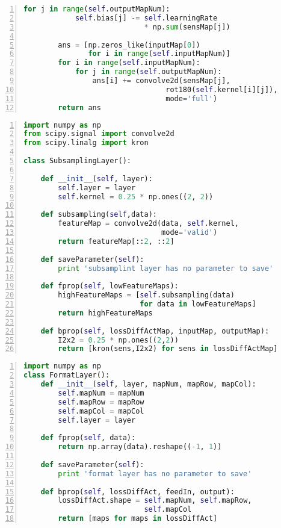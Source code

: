 \begin{lstlisting}[language=Python,numbers=left, frame=shadowbox, rulesepcolor=\color{cadegrey}, caption=\text{ConvLayer.py}]
        for j in range(self.outputMapNum):
            self.bias[j] -= self.learningRate 
                            * np.sum(sensMap[j])

        ans = [np.zeros_like(inputMap[0]) 
               for i in range(self.inputMapNum)]
        for i in range(self.inputMapNum):
            for j in range(self.outputMapNum):
                ans[i] += convolve2d(sensMap[j], 
                                 rot180(self.kernel[i][j]),
                                 mode='full')
        return ans
\end{lstlisting}

\newpage

\begin{lstlisting}[language=Python,numbers=left, frame=shadowbox, rulesepcolor=\color{cadegrey}, caption=\text{SubsamplingLayer.py}]
import numpy as np
from scipy.signal import convolve2d
from scipy.linalg import kron

class SubsamplingLayer():
    
    def __init__(self, layer):
        self.layer = layer
        self.kernel = 0.25 * np.ones((2, 2))
    
    def subsampling(self,data):
        featureMap = convolve2d(data, self.kernel, 
                                mode='valid')
        return featureMap[::2, ::2]
    
    def saveParameter(self):
        print 'subsamplint layer has no parameter to save'
        
    def fprop(self, lowFeatureMaps):
        highFeatureMaps = [self.subsampling(data) 
                           for data in lowFeatureMaps]
        return highFeatureMaps
    
    def bprop(self, lossDiffActMap, inputMap, outputMap):
        I2x2 = 0.25 * np.ones((2,2))
        return [kron(sens,I2x2) for sens in lossDiffActMap]
\end{lstlisting}

\newpage

\begin{lstlisting}[language=Python,numbers=left, frame=shadowbox, rulesepcolor=\color{cadegrey}, caption=\text{FormatLayer.py}]
import numpy as np
class FormatLayer():
    def __init__(self, layer, mapNum, mapRow, mapCol):
        self.mapNum = mapNum
        self.mapRow = mapRow
        self.mapCol = mapCol
        self.layer = layer
    
    def fprop(self, data):
        return np.array(data).reshape((-1, 1))
    
    def saveParameter(self):
        print 'format layer has no parameter to save'
    
    def bprop(self, lossDiffAct, feedIn, output):
        lossDiffAct.shape = self.mapNum, self.mapRow, 
                            self.mapCol
        return [maps for maps in lossDiffAct]
\end{lstlisting}

